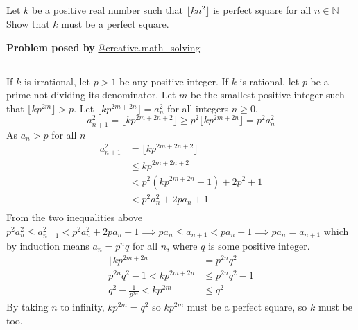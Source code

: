 \documentclass[12pt]{article}
\begin{document}
\subsection*{}
Let $k$ be a positive real number such that $\lfloor kn^2 \rfloor$ is perfect square for all $n\in \mathbb{N}$ Show that $k$ must be a perfect square.
\begin{flushright}
\textbf{Problem posed by} \textcolor{RoyalBlue2}{\href{https://www.instagram.com/creative.math_solving/}{@creative.math\_solving}}
\end{flushright}








\subsection*{}
If $k$ is irrational, let $p>1$ be any positive integer. If $k$ is rational, let $p$ be a prime not dividing its denominator.
Let $m$ be the smallest positive integer such that $\lfloor kp^{2m}\rfloor>p$. Let $\lfloor kp^{2m+2n}\rfloor=a_n^2$ for all integers $n\ge0$.
$$a_{n+1}^2=\lfloor kp^{2m+2n+2}\rfloor\ge p^2\lfloor kp^{2m+2n}\rfloor=p^2a_n^2$$
As $a_n>p$ for all $n$
\begin{align*}
a_{n+1}^2&=\lfloor kp^{2m+2n+2}\rfloor\\
&\le kp^{2m+2n+2}\\
&<p^2(kp^{2m+2n}-1)+2p^2+1\\
&<p^2a_n^2+2pa_n+1\\
\end{align*}
From the two inequalities above $p^2a_n^2\le a_{n+1}^2<p^2a_n^2+2pa_n+1\implies pa_n\le a_{n+1}<pa_n+1\implies pa_n=a_{n+1}$ which by induction means $a_n=p^nq$ for all $n$, where $q$ is some positive integer.
\begin{align*}\lfloor kp^{2m+2n}\rfloor&=p^{2n}q^2\\
p^{2n}q^2-1<kp^{2m+2n}&\le p^{2n}q^2-1\\
q^2-\frac1{p^{2n}}<kp^{2m}&\le q^2\end{align*}
By taking $n$ to infinity, $kp^{2m}=q^2$ so $kp^{2m}$ must be a perfect square, so $k$ must be too.
\end{document}
